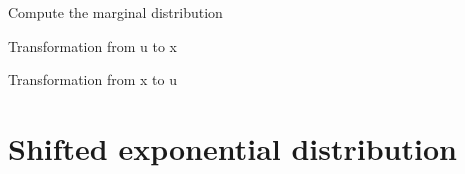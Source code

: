\documentclass[letterpaper,10pt,english]{sphinxmanual}
\begin{document}
\begin{fulllineitems}
\begin{fulllineitems}
Compute the marginal distribution

\end{fulllineitems}



\begin{fulllineitems}
Transformation from u to x

\end{fulllineitems}



\begin{fulllineitems}
Transformation from x to u

\end{fulllineitems}


\end{fulllineitems}



\section{Shifted exponential distribution}
\label{distributions:shifted-exponential-distribution}
\end{document}
